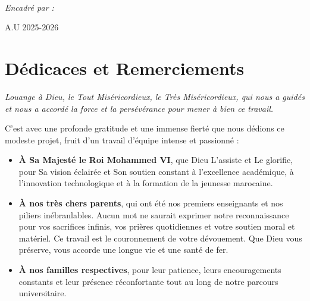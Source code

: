 \documentclass[12pt,a4paper]{report}
\begin{document}
\begin{titlepage}
\begin{center}
\begin{minipage}{0.45\textwidth}
\begin{center}
    \end{center}
\end{minipage}
\\

\begin{center}
    \large \emph{Encadré par :}\\
    \vspace{0.2cm}
\end{center}




\vfill

{A.U 2025-2026}

\end{center}
\end{titlepage}





\chapter*{Dédicaces et Remerciements}

\begin{center}
\textit{Louange à Dieu, le Tout Miséricordieux, le Très Miséricordieux, qui nous a guidés et nous a accordé la force et la persévérance pour mener à bien ce travail.}
\end{center}

\vspace{0.4cm}

\noindent C'est avec une profonde gratitude et une immense fierté que nous dédions ce modeste projet, fruit d'un travail d'équipe intense et passionné :

\begin{itemize}
    \item \textbf{À Sa Majesté le Roi Mohammed VI}, que Dieu L'assiste et Le glorifie, pour Sa vision éclairée et Son soutien constant à l'excellence académique, à l'innovation technologique et à la formation de la jeunesse marocaine.
    \item \textbf{À nos très chers parents}, qui ont été nos premiers enseignants et nos piliers inébranlables. Aucun mot ne saurait exprimer notre reconnaissance pour vos sacrifices infinis, vos prières quotidiennes et votre soutien moral et matériel. Ce travail est le couronnement de votre dévouement. Que Dieu vous préserve, vous accorde une longue vie et une santé de fer.
    \item \textbf{À nos familles respectives}, pour leur patience, leurs encouragements constants et leur présence réconfortante tout au long de notre parcours universitaire.
\end{itemize}
\end{document}
